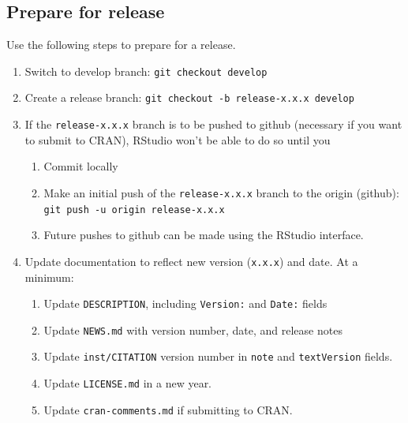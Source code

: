 \documentclass{article}
\begin{document}
\subsection{Prepare for release}
\label{sec:prep-for-release}

Use the following steps to prepare for a release.

\begin{enumerate}

  \item Switch to develop branch: \texttt{git checkout develop}

  \item Create a release branch: \texttt{git checkout -b release-x.x.x develop}

  \item If the \texttt{release-x.x.x} branch is to be pushed to github
        (necessary if you want to submit to CRAN),
        RStudio won't be able to do so until you
  \begin{enumerate}

    \item Commit locally

    \item Make an initial push of the \texttt{release-x.x.x} branch
	      to the origin (github):
		  \texttt{git push -u origin release-x.x.x}

	\item Future pushes to github can be made using the RStudio interface.

  \end{enumerate}
  \item Update documentation to reflect new version (\texttt{x.x.x}) and date.
        At a minimum:
  \begin{enumerate}

    \item Update \texttt{DESCRIPTION}, including \texttt{Version:} and \texttt{Date:} fields

    \item Update \texttt{NEWS.md} with version number, date, and release notes

	\item Update \texttt{inst/CITATION} version number
	      in \texttt{note} and \texttt{textVersion} fields.

    \item Update \texttt{LICENSE.md} in a new year.

    \item Update \texttt{cran-comments.md} if submitting to CRAN.


\end{enumerate}
\end{enumerate}
\end{document}
